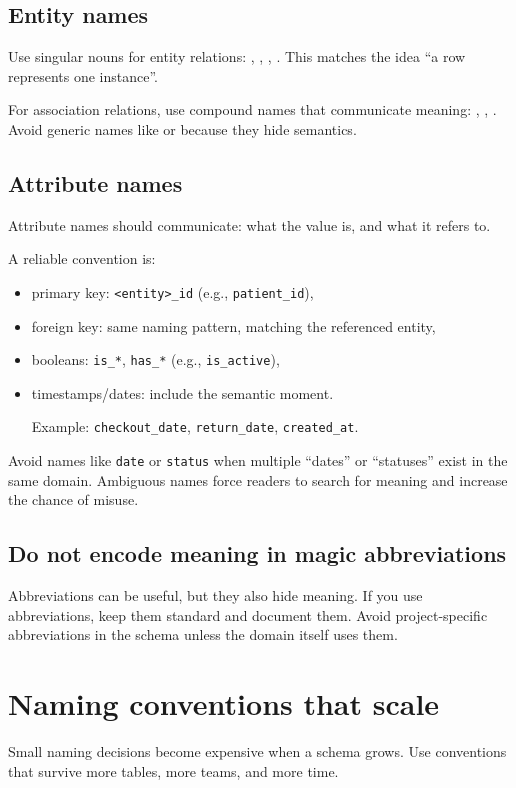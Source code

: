 \subsection{Entity names}
Use singular nouns for entity relations: , , , .
This matches the idea “a row represents one instance”.

For association relations, use compound names that communicate meaning:
, , .
Avoid generic names like  or  because they hide semantics.

\subsection{Attribute names}
Attribute names should communicate:
what the value is, and what it refers to.

A reliable convention is:
\begin{itemize}[leftmargin=*,nosep]
  \item primary key: \texttt{<entity>\_id} (e.g., \texttt{patient\_id}),
  \item foreign key: same naming pattern, matching the referenced entity,
  \item booleans: \texttt{is\_*}, \texttt{has\_*} (e.g., \texttt{is\_active}),
  \item timestamps/dates: include the semantic moment.\par
        Example: \texttt{checkout\_date}, \texttt{return\_date}, \texttt{created\_at}.
\end{itemize}

Avoid names like \texttt{date} or \texttt{status} when multiple “dates” or “statuses” exist in the same domain.
Ambiguous names force readers to search for meaning and increase the chance of misuse.

\subsection{Do not encode meaning in magic abbreviations}
Abbreviations can be useful, but they also hide meaning.
If you use abbreviations, keep them standard and document them.
Avoid project-specific abbreviations in the schema unless the domain itself uses them.

\section{Naming conventions that scale}
Small naming decisions become expensive when a schema grows.
Use conventions that survive more tables, more teams, and more time.


